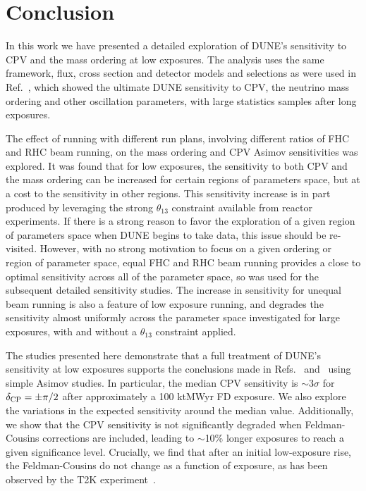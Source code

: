 \section{Conclusion}
\label{sec:conclude}

In this work we have presented a detailed exploration of DUNE's sensitivity to CPV and the mass ordering at low exposures. The analysis uses the same framework, flux, cross section and detector models and selections as were used in Ref.~\cite{Abi:2020qib}, which showed the ultimate DUNE sensitivity to CPV, the neutrino mass ordering and other oscillation parameters, with large statistics samples after long exposures.

The effect of running with different run plans, involving different ratios of FHC and RHC beam running, on the mass ordering and CPV Asimov sensitivities was explored. It was found that for low exposures, the sensitivity to both CPV and the mass ordering can be increased for certain regions of parameters space, but at a cost to the sensitivity in other regions. This sensitivity increase is in part produced by leveraging the strong $\theta_{13}$ constraint available from reactor experiments. If there is a strong reason to favor the exploration of a given region of parameters space when DUNE begins to take data, this issue should be re-visited. However, with no strong motivation to focus on a given ordering or region of \deltacp parameter space, equal FHC and RHC beam running provides a close to optimal sensitivity across all of the parameter space, so was used for the subsequent detailed sensitivity studies. The increase in sensitivity for unequal beam running is also a feature of low exposure running, and degrades the sensitivity almost uniformly across the parameter space investigated for large exposures, with and without a $\theta_{13}$ constraint applied.

The studies presented here demonstrate that a full treatment of DUNE's sensitivity at low exposures supports the conclusions made in Refs.~\cite{Abi:2020qib} and~\cite{Abi:2020evt} using simple Asimov studies. In particular, the median CPV sensitivity is $\sim$3$\sigma$ for $\delta_{\rm CP} = \pm\pi/2$ after approximately a 100 ktMWyr FD exposure. We also explore the variations in the expected sensitivity around the median value. Additionally, we show that the CPV sensitivity is not significantly degraded when Feldman-Cousins corrections are included, leading to $\sim$10\% longer exposures to reach a given significance level. Crucially, we find that after an initial low-exposure rise, the Feldman-Cousins \dchisqcrit do not change as a function of exposure, as has been observed by the T2K experiment~\cite{Abe:2021gky}.

